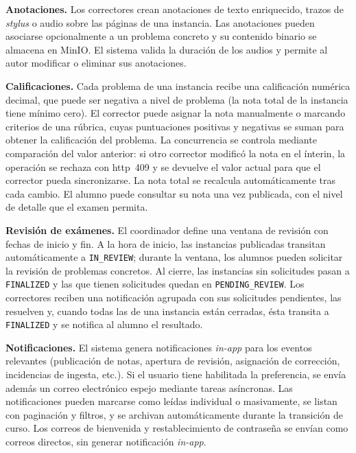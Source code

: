 \begin{functional}
  \item \textbf{Anotaciones.}
  \label{rf:annotations}
  Los correctores crean anotaciones de texto enriquecido, trazos de
  \textit{stylus} o audio sobre las páginas de una instancia. Las
  anotaciones pueden asociarse opcionalmente a un problema concreto y
  su contenido binario se almacena en MinIO. El sistema valida la
  duración de los audios y permite al autor modificar o eliminar sus
  anotaciones.

  \item \textbf{Calificaciones.}
  \label{rf:grading}
  Cada problema de una instancia recibe una calificación numérica
  decimal, que puede ser negativa a nivel de problema (la nota total de
  la instancia tiene mínimo cero). El corrector puede asignar la nota
  manualmente o marcando criterios de una rúbrica, cuyas puntuaciones
  positivas y negativas se suman para obtener la calificación del
  problema. La concurrencia se controla mediante comparación del valor
  anterior: si otro corrector modificó la nota en el ínterin, la
  operación se rechaza con \acs{http}~409 y se devuelve el valor actual
  para que el corrector pueda sincronizarse. La nota total se recalcula
  automáticamente tras cada cambio. El alumno puede consultar su nota
  una vez publicada, con el nivel de detalle que el examen permita.

  \item \textbf{Revisión de exámenes.}
  \label{rf:review}
  El coordinador define una ventana de revisión con fechas de inicio y
  fin. A la hora de inicio, las instancias publicadas transitan
  automáticamente a \texttt{IN\_REVIEW}; durante la ventana, los
  alumnos pueden solicitar la revisión de problemas concretos. Al
  cierre, las instancias sin solicitudes pasan a \texttt{FINALIZED} y
  las que tienen solicitudes quedan en \texttt{PENDING\_REVIEW}. Los
  correctores reciben una notificación agrupada con sus solicitudes
  pendientes, las resuelven y, cuando todas las de una instancia están
  cerradas, ésta transita a \texttt{FINALIZED} y se notifica al alumno
  el resultado.

  \item \textbf{Notificaciones.}
  \label{rf:notif}
  El sistema genera notificaciones \textit{in-app} para los eventos
  relevantes (publicación de notas, apertura de revisión, asignación de
  corrección, incidencias de ingesta, etc.). Si el usuario tiene
  habilitada la preferencia, se envía además un correo electrónico
  espejo mediante tareas asíncronas. Las notificaciones pueden marcarse
  como leídas individual o masivamente, se listan con paginación y
  filtros, y se archivan automáticamente durante la transición de
  curso. Los correos de bienvenida y restablecimiento de contraseña se
  envían como correos directos, sin generar notificación
  \textit{in-app}.


\end{functional}

